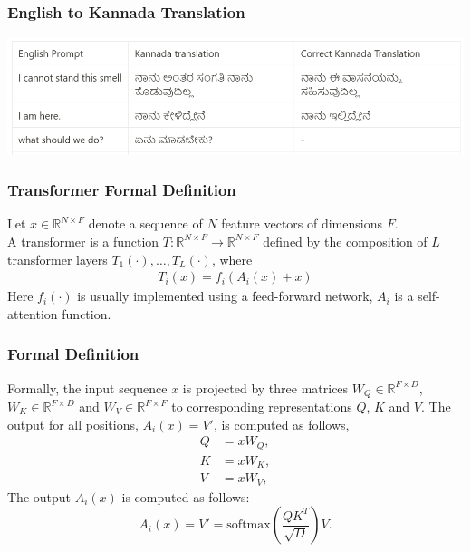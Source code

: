 \documentclass{beamer}
\begin{document}
\begin{frame}
\begin{columns}[T]
\begin{column}{.4\textwidth}
                \vspace{0.5cm}
                \begin{center}
                    \begin{minipage}{\linewidth} %
                        \tiny %
                    \end{minipage}
                \end{center}
            \end{column}
        \end{columns}
    \end{frame}
    \begin{frame}
        \frametitle{English to Kannada Translation}
        \begin{center}
            \includegraphics[width=1\textwidth]{images/kannada.png} %
        \end{center}
    \end{frame}
    \begin{frame}
        \frametitle{Transformer Formal Definition}
        Let $x \in \mathbb{R}^{N \times F}$ denote a sequence of $N$ feature vectors of dimensions $F$.\\
        A transformer is a function $T : \mathbb{R}^{N \times F} \rightarrow \mathbb{R}^{N \times F}$ defined by the composition of $L$ transformer layers $T_1(\cdot), \ldots, T_L(\cdot)$, where
        \begin{align*}
            T_i(x) = f_i(A_i(x) + x)
        \end{align*}
        Here $f_i(\cdot)$ is usually implemented using a feed-forward network, $A_i$ is a self-attention function. 
    \end{frame}
    \begin{frame}
        \frametitle{Formal Definition}
        Formally, the input sequence $x$ is projected by three matrices $W_Q \in \mathbb{R}^{F \times D}$, $W_K \in \mathbb{R}^{F \times D}$ and $W_V \in \mathbb{R}^{F \times F}$ to corresponding representations $Q$, $K$ and $V$. The output for all positions, $A_i(x) = V'$, is computed as follows,
        \begin{align*}
            Q &= xW_Q, \\
            K &= xW_K, \\
            V &= xW_V,
        \end{align*}
        The output $A_i(x)$ is computed as follows:
    \[A_i(x) = V' = \text{softmax}\left(\frac{QK^T}{\sqrt{D}}\right)V.\]
    \end{frame} 
\end{document}
